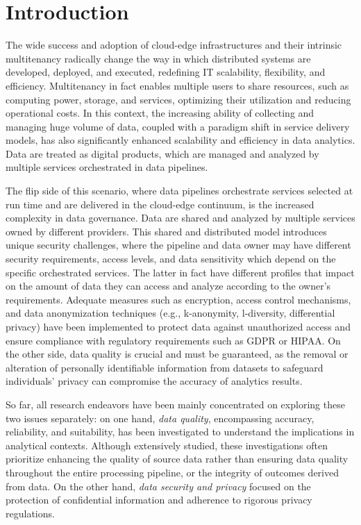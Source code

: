 \section{Introduction}
The wide success and adoption of cloud-edge infrastructures and their intrinsic multitenancy radically change the way in which distributed systems are developed, deployed, and executed, redefining IT scalability, flexibility, and efficiency. Multitenancy in fact enables multiple users to share resources, such as computing power, storage, and services, optimizing their utilization and reducing operational costs. In this context, the increasing ability of collecting and managing huge volume of data, coupled with a paradigm shift in service delivery models, has also significantly enhanced scalability and efficiency in data analytics. Data are treated as digital products, which are managed and analyzed by multiple services orchestrated in data pipelines. 

The flip side of this scenario, where data pipelines orchestrate services selected at run time and are delivered in the cloud-edge continuum, is the increased complexity in data governance. Data are shared and analyzed by multiple services owned by different providers. This shared and distributed model introduces unique security challenges, where the pipeline and data owner may have different security requirements, access levels, and data sensitivity which depend on the specific orchestrated services. The latter in fact have different profiles that impact on the amount of data they can access and analyze according to the owner's requirements. 
%
Adequate measures such as encryption, access control mechanisms, and data anonymization techniques (e.g., k-anonymity, l-diversity, differential privacy) have been implemented to protect data against unauthorized access and ensure compliance with regulatory requirements such as GDPR or HIPAA. On the other side, data quality is crucial and must be guaranteed, as the removal or alteration of personally identifiable information from datasets to safeguard individuals' privacy can compromise the accuracy of analytics results.

So far, all research endeavors have been mainly concentrated on exploring these two issues separately: on one hand, \emph{data quality}, encompassing accuracy, reliability, and suitability, has been investigated to understand the implications in analytical contexts. Although extensively studied, these investigations often prioritize enhancing the quality of source data rather than ensuring data quality throughout the entire processing pipeline, or the integrity of outcomes derived from data. On the other hand, \emph{data security and privacy} focused on the protection of confidential information and adherence to rigorous privacy regulations.

